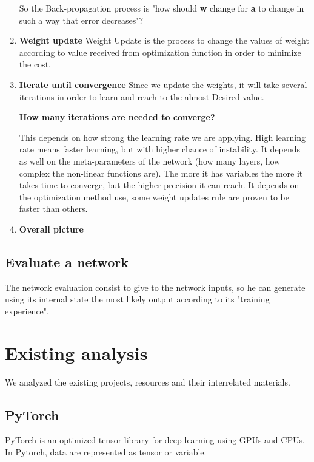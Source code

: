 \begin{enumerate}
        So the Back-propagation process is "how should \textbf{w} change for \textbf{a} to change in such a way that error decreases"?
    \item \textbf{Weight update}
        Weight Update is the process to change the values of weight according to value received from optimization function in order to minimize the cost.
    \item \textbf{Iterate until convergence}
    Since we update the weights, it will take several iterations in order to learn and reach to the almost Desired value. \newline 
    \par \textbf{How many iterations are needed to converge?} \newline 
    
    \par This depends on how strong the learning rate we are applying. High learning rate means faster learning, but with higher chance of instability. \newline 
    It depends as well on the meta-parameters of the network (how many layers, how complex the non-linear functions are). The more it has variables the more it takes time to converge, but the higher precision it can reach. \newline 
    It depends on the optimization method use, some weight updates rule are proven to be faster than others.
    \item \textbf{Overall picture}
\end{enumerate}



\subsection{Evaluate a network}
The network evaluation consist to give to the network inputs, so he can generate using its internal state the most likely output according to its "training experience".

\section{Existing analysis}
We analyzed the existing projects, resources and their interrelated materials. 
\subsection{PyTorch}
PyTorch is an optimized tensor library for deep learning using GPUs and CPUs. In Pytorch, data are represented as tensor or variable.

